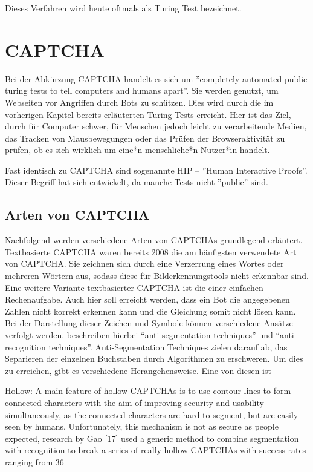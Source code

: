 Dieses Verfahren wird heute oftmals als Turing Test bezeichnet. 

\section{CAPTCHA}
Bei der Abkürzung CAPTCHA handelt es sich um ''completely automated public turing tests to tell computers and humans apart''. 
Sie werden genutzt, um Webseiten vor Angriffen durch Bots zu schützen. 
Dies wird durch die im vorherigen Kapitel bereits erläuterten Turing Tests erreicht. 
Hier ist das Ziel, durch für Computer schwer, für Menschen jedoch leicht zu verarbeitende Medien, das Tracken von Mausbewegungen
oder das Prüfen der Browseraktivität zu prüfen, ob es sich wirklich um eine*n menschliche*n Nutzer*in handelt.

Fast identisch zu CAPTCHA sind sogenannte HIP – ''Human Interactive Proofs''. 
Dieser Begriff hat sich entwickelt, da manche Tests nicht ''public'' sind. \cite[p.1]{chellapilla} \cite{tutorial} 

\subsection{Arten von CAPTCHA}
Nachfolgend werden verschiedene Arten von CAPTCHAs grundlegend erläutert.
Textbasierte CAPTCHA waren bereits 2008 die am häufigsten verwendete Art von CAPTCHA.
Sie zeichnen sich durch eine Verzerrung eines Wortes oder mehreren Wörtern aus, sodass diese für Bilderkennungstools nicht erkennbar sind.
Eine weitere Variante textbasierter CAPTCHA ist die einer einfachen Rechenaufgabe. 
Auch hier soll erreicht werden, dass ein Bot die angegebenen Zahlen nicht korrekt erkennen kann und die Gleichung somit nicht lösen kann. \cite{usabilityofcaptchas} \cite[p.75]{surveyofresearch} \cite{shinde2018DIFFERENTTO} %
Bei der Darstellung dieser Zeichen und Symbole können verschiedene Ansätze verfolgt werden.
\citeauthor{surveyofresearch} beschreiben hierbei ``anti-segmentation techniques'' und ``anti-recognition techniques''. \cite[p.76]{surveyofresearch}
Anti-Segmentation Techniques zielen darauf ab, das Separieren der einzelnen Buchstaben durch Algorithmen zu erschweren. 
Um dies zu erreichen, gibt es verschiedene Herangehensweise.
Eine von diesen ist 

Hollow: A main feature of hollow CAPTCHAs is to use
contour lines to form connected characters with the aim of
improving security and usability simultaneously, as the
connected characters are hard to segment, but are easily seen
by humans. Unfortunately, this mechanism is not as secure as
people expected, research by Gao [17] used a generic method
to combine segmentation with recognition to break a series of
really hollow CAPTCHAs with success rates ranging from
36%


